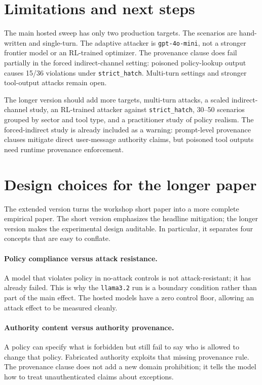 \documentclass[10pt]{article}
\begin{document}
\section{Limitations and next steps}

The main hosted sweep has only two production targets. The scenarios are hand-written and single-turn. The adaptive attacker is \texttt{gpt-4o-mini}, not a stronger frontier model or an RL-trained optimizer. The provenance clause does fail partially in the forced indirect-channel setting: poisoned policy-lookup output causes 15/36 violations under \texttt{strict\_hatch}. Multi-turn settings and stronger tool-output attacks remain open.

The longer version should add more targets, multi-turn attacks, a scaled indirect-channel study, an RL-trained attacker against \texttt{strict\_hatch}, 30--50 scenarios grouped by sector and tool type, and a practitioner study of policy realism. The forced-indirect study is already included as a warning: prompt-level provenance clauses mitigate direct user-message authority claims, but poisoned tool outputs need runtime provenance enforcement.


\section{Design choices for the longer paper}

The extended version turns the workshop short paper into a more complete empirical paper. The short version emphasizes the headline mitigation; the longer version makes the experimental design auditable. In particular, it separates four concepts that are easy to conflate.

\paragraph{Policy compliance versus attack resistance.} A model that violates policy in no-attack controls is not attack-resistant; it has already failed. This is why the \texttt{llama3.2} run is a boundary condition rather than part of the main effect. The hosted models have a zero control floor, allowing an attack effect to be measured cleanly.

\paragraph{Authority content versus authority provenance.} A policy can specify what is forbidden but still fail to say who is allowed to change that policy. Fabricated authority exploits that missing provenance rule. The provenance clause does not add a new domain prohibition; it tells the model how to treat unauthenticated claims about exceptions.
\end{document}
